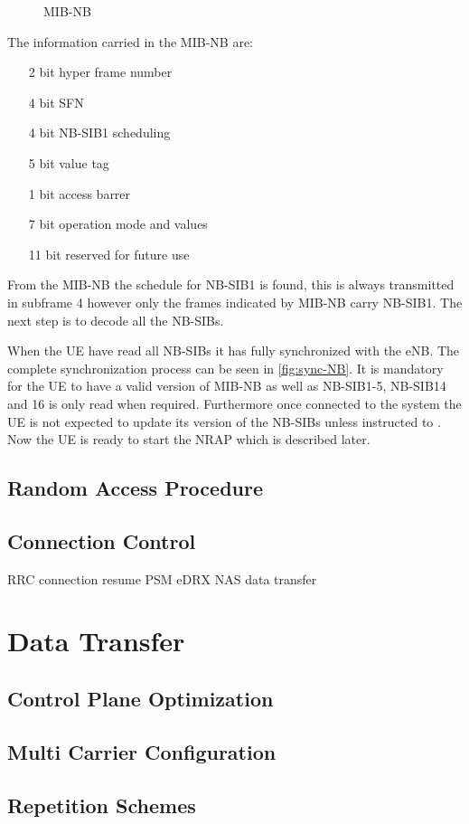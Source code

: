 \begin{figure}[H]
\centering

\caption{MIB-NB}
\label{fig:MIB-NB}
\end{figure}

The information carried in the \gls{MIB-NB} are:

\begin{itemize}
\item[2 bit] hyper frame number
\item[4 bit] \gls{SFN}
\item[4 bit] \gls{NB-SIB}1 scheduling
\item[5 bit] value tag
\item[1 bit] access barrer
\item[7 bit] operation mode and values
\item[11 bit] reserved for future use
\end{itemize}

From the \gls{MIB-NB} the schedule for \gls{NB-SIB}1 is found, this is always transmitted in subframe 4 however only the frames indicated by \gls{MIB-NB} carry \gls{NB-SIB}1. The next step is to decode all the \gls{NB-SIB}s.

When the \gls{UE} have read all \gls{NB-SIB}s it has fully synchronized with the \gls{eNB}. The complete synchronization process can be seen in \autoref{fig:sync-NB}. It is mandatory for the \gls{UE} to have a valid version of \gls{MIB-NB} as well as \gls{NB-SIB}1-5, \gls{NB-SIB}14 and 16 is only read when required. Furthermore once connected to the system the \gls{UE} is not expected to update its version of the \gls{NB-SIB}s unless instructed to \citep{whitepaper}. Now the \gls{UE} is ready to start the \gls{NRAP} which is described later. 




\subsection{Random Access Procedure} \label{sec:RAP}

\subsection{Connection Control}

RRC connection resume
PSM
eDRX
NAS data transfer

\section{Data Transfer}

\subsection{Control Plane Optimization}

\subsection{Multi Carrier Configuration}

\subsection{Repetition Schemes}

